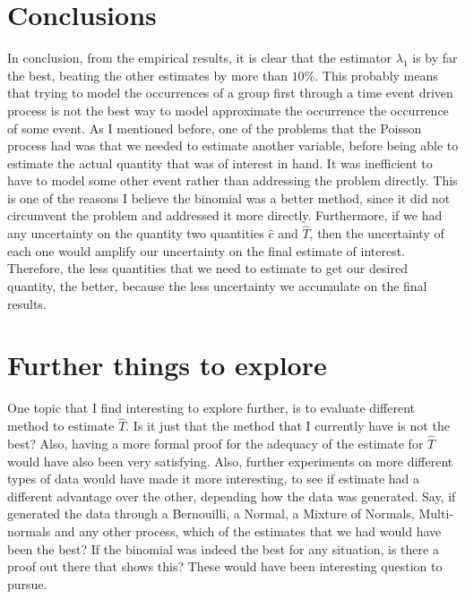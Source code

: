 \documentclass[a4paper]{article}
\begin{document}
\section{Conclusions}

In conclusion, from the empirical results, it is clear that the estimator $\lambda_1$ is by far the best, beating the other estimates by more than $10\%$.
This probably means that trying to model the occurrences of a group first through a time event driven process is not the best way to model approximate the occurrence the occurrence of some event.
As I mentioned before, one of the problems that the Poisson process had was that we needed to estimate another variable, before being able to estimate the actual quantity that was of interest in hand.
It was inefficient to have to model some other event rather than addressing the problem directly.
This is one of the reasons I believe the binomial was a better method, since it did not circumvent the problem and addressed it more directly.
Furthermore, if we had any uncertainty on the quantity two quantities $\hat{c}$ and $\hat{T}$, then the uncertainty of each one would amplify our uncertainty on the final estimate of interest.
Therefore, the less quantities that we need to estimate to get our desired quantity, the better, because the less uncertainty we accumulate on the final results. 

\section{Further things to explore}

One topic that I find interesting to explore further, is to evaluate different method to estimate $\hat{T}$.
Is it just that the method that I currently have is not the best?
Also, having a more formal proof for the adequacy of the estimate for $\hat{T}$ would have also been very satisfying.
Also, further experiments on more different types of data would have made it more interesting, to see if estimate had a different advantage over the other, depending how the data was generated.
Say, if generated the data through a Bernouilli, a Normal, a Mixture of Normals, Multi-normals and any other process, which of the estimates that we had would have been the best?
If the binomial was indeed the best for any situation, is there a proof out there that shows this?
These would have been interesting question to pursue.
\end{document}
